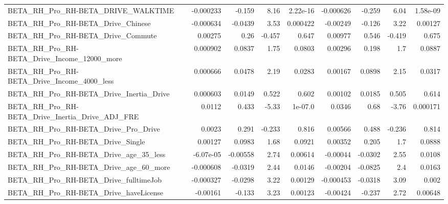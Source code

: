 \begin{tabular}{lrrrrrrrr}
BETA\_RH\_Pro\_RH-BETA\_DRIVE\_WALKTIME                 &   -0.000233 &       -0.159 &     8.16 & 2.22e-16 &  -0.000626 &      -0.259 &         6.04 &      1.58e-09 \\
BETA\_RH\_Pro\_RH-BETA\_Drive\_Chinese                  &   -0.000634 &      -0.0439 &     3.53 & 0.000422 &   -0.00249 &      -0.126 &         3.22 &       0.00127 \\
BETA\_RH\_Pro\_RH-BETA\_Drive\_Commute                  &     0.00275 &         0.26 &   -0.457 &    0.647 &    0.00977 &       0.546 &       -0.419 &         0.675 \\
BETA\_RH\_Pro\_RH-BETA\_Drive\_Income\_12000\_more        &    0.000902 &       0.0837 &     1.75 &   0.0803 &    0.00296 &       0.198 &          1.7 &        0.0887 \\
BETA\_RH\_Pro\_RH-BETA\_Drive\_Income\_4000\_less         &    0.000666 &       0.0478 &     2.19 &   0.0283 &    0.00167 &      0.0898 &         2.15 &        0.0317 \\
BETA\_RH\_Pro\_RH-BETA\_Drive\_Inertia\_Drive            &    0.000603 &       0.0149 &    0.522 &    0.602 &    0.00102 &      0.0185 &        0.505 &         0.614 \\
BETA\_RH\_Pro\_RH-BETA\_Drive\_Inertia\_Drive\_ADJ\_FRE    &      0.0112 &        0.433 &    -5.33 &  1e-07.0 &     0.0346 &        0.68 &        -3.76 &      0.000171 \\
BETA\_RH\_Pro\_RH-BETA\_Drive\_Pro\_Drive                &      0.0023 &        0.291 &   -0.233 &    0.816 &    0.00566 &       0.488 &       -0.236 &         0.814 \\
BETA\_RH\_Pro\_RH-BETA\_Drive\_Single                   &     0.00127 &       0.0983 &     1.68 &   0.0921 &    0.00352 &       0.205 &          1.7 &        0.0888 \\
BETA\_RH\_Pro\_RH-BETA\_Drive\_age\_35\_less              &   -6.07e-05 &     -0.00558 &     2.74 &  0.00614 &   -0.00044 &     -0.0302 &         2.55 &        0.0108 \\
BETA\_RH\_Pro\_RH-BETA\_Drive\_age\_60\_more              &   -0.000608 &      -0.0319 &     2.44 &   0.0146 &   -0.00204 &     -0.0825 &          2.4 &        0.0163 \\
BETA\_RH\_Pro\_RH-BETA\_Drive\_fulltimeJob              &   -0.000327 &      -0.0298 &     3.22 &  0.00129 &  -0.000453 &     -0.0318 &         3.09 &         0.002 \\
BETA\_RH\_Pro\_RH-BETA\_Drive\_haveLicense              &    -0.00161 &       -0.133 &     3.23 &  0.00123 &   -0.00424 &      -0.237 &         2.72 &       0.00648 \\

\end{tabular}
